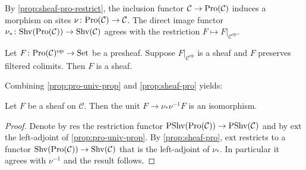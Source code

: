 By \ref{prop:sheaf-pro-restrict}, the inclusion functor $\mathcal{C} \to \mathrm{Pro}(\mathcal{C})$ induces a morphism on sites
$\nu\colon \mathrm{Pro}(\mathcal{C}) \to \mathcal{C}$.
The direct image functor $\nu_{*}\colon \mathrm{Shv}(\mathrm{Pro}(\mathcal{C})) \to \mathrm{Shv}(\mathcal{C})$ agrees with the
restriction $F \mapsto F|_{\mathcal{C}^{\mathrm{op}}}$.

\begin{proposition}
    Let $F \colon \mathrm{Pro}(\mathcal{C})^{\mathrm{op}} \to \mathrm{Set}$ be a presheaf. Suppose
    $F|_{\mathcal{C}^{\mathrm{op}}}$ is a sheaf and $F$ preserves filtered colimits. Then
    $F$ is a sheaf.
    \label{prop:sheaf-pro}
\end{proposition}

Combining \ref{prop:pro-univ-prop} and \ref{prop:sheaf-pro} yields:

\begin{corollary}
    Let $F$ be a sheaf on $\mathcal{C}$. Then the unit $F \to \nu_{*} \nu^{-1} F$ is an isomorphism.
    \label{cor:pro-direct-image-unit-iso}
\end{corollary}

\begin{proof}
    Denote by $\mathrm{res}$ the restriction functor
    $\mathrm{PShv}(\mathrm{Pro}(\mathcal{C})) \to \mathrm{PShv}(\mathcal{C})$ and by
    $\mathrm{ext}$ the left-adjoint of \ref{prop:pro-univ-prop}. By \ref{prop:sheaf-pro},
    $\mathrm{ext}$ restricts to a functor $\mathrm{Shv}(\mathrm{Pro}(\mathcal{C})) \to \mathrm{Shv}(\mathcal{C})$
    that is the left-adjoint of $\nu_*$. In particular it agrees with $\nu^{-1}$ and
    the result follows.
\end{proof}
